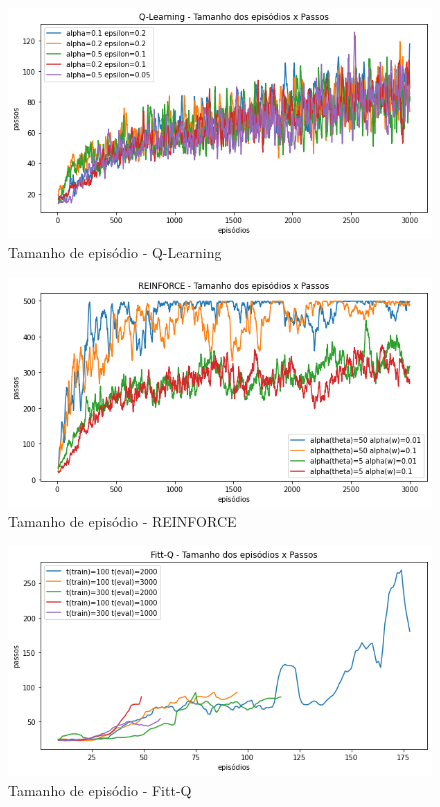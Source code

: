 \documentclass[letterpaper]{article}
\begin{document}
\begin{figure}[t]
  \centering
  \includegraphics[width=0.9\columnwidth]{exp-qlearning-episodes}
  \caption{Tamanho de episódio - Q-Learning}
  \label{fig:exp-qlearning-episodes}
\end{figure}

\begin{figure}[t]
  \centering
  \includegraphics[width=0.9\columnwidth]{exp-reinforce-episodes}
  \caption{Tamanho de episódio - REINFORCE}
  \label{fig:exp-reinforce-episodes}
\end{figure}

\begin{figure}[t]
  \centering
  \includegraphics[width=0.9\columnwidth]{exp-fittq-episodes}
  \caption{Tamanho de episódio - Fitt-Q}
  \label{fig:exp-fittq-episodes}
\end{figure}
\end{document}
